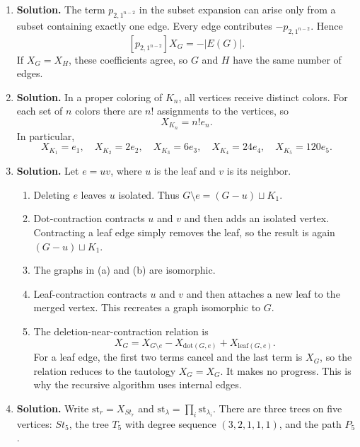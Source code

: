 \documentclass{article}
\begin{document}
\begin{enumerate}
\item \textbf{Solution.}
The term $p_{2,1^{n-2}}$ in the subset expansion can arise only from a
subset containing exactly one edge.  Every edge contributes
$-p_{2,1^{n-2}}$.  Hence
\[
\boxed{[p_{2,1^{n-2}}]X_G=-|E(G)|.}
\]
If $X_G=X_H$, these coefficients agree, so $G$ and $H$ have the same
number of edges.

\item \textbf{Solution.}
In a proper coloring of $K_n$, all vertices receive distinct colors.
For each set of $n$ colors there are $n!$ assignments to the vertices,
so
\[
\boxed{X_{K_n}=n!e_n.}
\]
In particular,
\[
X_{K_1}=e_1,\quad
X_{K_2}=2e_2,\quad
X_{K_3}=6e_3,\quad
X_{K_4}=24e_4,\quad
X_{K_5}=120e_5.
\]

\item \textbf{Solution.}
Let $e=uv$, where $u$ is the leaf and $v$ is its neighbor.
\begin{enumerate}
\item Deleting $e$ leaves $u$ isolated.  Thus
$G\setminus e=(G-u)\mathbin{\sqcup}K_1$.

\item Dot-contraction contracts $u$ and $v$ and then adds an isolated
vertex.  Contracting a leaf edge simply removes the leaf, so the
result is again $(G-u)\mathbin{\sqcup}K_1$.

\item The graphs in (a) and (b) are isomorphic.

\item Leaf-contraction contracts $u$ and $v$ and then attaches a new
leaf to the merged vertex.  This recreates a graph isomorphic to $G$.

\item The deletion-near-contraction relation is
\[
X_G=X_{G\setminus e}-X_{\text{dot}(G,e)}
    +X_{\text{leaf}(G,e)}.
\]
For a leaf edge, the first two terms cancel and the last term is
$X_G$, so the relation reduces to the tautology $X_G=X_G$.  It makes
no progress.  This is why the recursive algorithm uses internal
edges.
\end{enumerate}

\item \textbf{Solution.}
Write $\mathrm{st}_r=X_{St_r}$ and
$\mathrm{st}_\lambda=\prod_i\mathrm{st}_{\lambda_i}$.  There are
three trees on five vertices: $St_5$, the tree $T_5$ with degree
sequence $(3,2,1,1,1)$, and the path $P_5$.


\end{enumerate}
\end{document}
